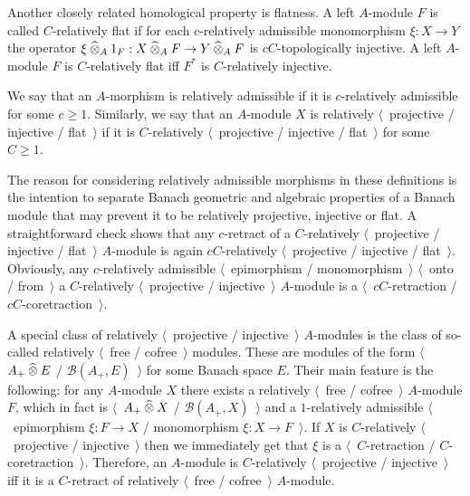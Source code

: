 Another closely related homological property is flatness. A
left $A$-module $F$ is called $C$-relatively flat if for each
$c$-relatively admissible monomorphism $\xi:X\to Y$ the operator 
$\xi\mathbin{\widehat{\otimes}}_{A} 1_F:X\mathbin{\widehat{\otimes}}_{A} F\to Y\mathbin{\widehat{\otimes}}_{A} F$ is
$cC$-topologically injective. A left $A$-module $F$ is $C$-relatively flat iff
$F^*$ is $C$-relatively injective. 

We say that an $A$-morphism is relatively admissible if it is $c$-relatively 
admissible for some $c\geq 1$. Similarly, we say that an $A$-module $X$ is 
relatively $\langle$~projective / injective / flat~$\rangle$ if it is  
$C$-relatively $\langle$~projective / injective / flat~$\rangle$ for 
some $C\geq 1$.

The reason for considering relatively admissible morphisms in these definitions
is the intention to separate Banach geometric and algebraic properties of a 
Banach module that may prevent it to be relatively projective, injective or flat. 
A straightforward check shows that any $c$-retract of a 
$C$-relatively $\langle$~projective / injective / flat~$\rangle$ $A$-module is 
again $cC$-relatively $\langle$~projective / injective / flat~$\rangle$. 
Obviously, any $c$-relatively admissible $\langle$~epimorphism
/ monomorphism~$\rangle$ $\langle$~onto / from~$\rangle$ a $C$-relatively
$\langle$~projective / injective~$\rangle$ $A$-module is a 
$\langle$~$cC$-retraction / $cC$-coretraction~$\rangle$.

A special class of relatively $\langle$~projective / injective~$\rangle$
$A$-modules is the class of so-called 
relatively $\langle$~free / cofree~$\rangle$ modules. 
These are modules of the form $\langle$~$A_+\mathbin{\widehat{\otimes}} E$ /
$\mathcal{B}(A_+,E)$~$\rangle$ for some Banach space $E$. Their main feature is
the following: for any $A$-module $X$ there exists a relatively $\langle$~free /
cofree~$\rangle$ $A$-module $F$, which in fact is $\langle$~$A_+\mathbin{\widehat{\otimes}} X$ /
$\mathcal{B}(A_+,X)$~$\rangle$ and a $1$-relatively admissible 
$\langle$~epimorphism $\xi:F\to X$ / monomorphism $\xi:X\to F$~$\rangle$. 
If $X$ is $C$-relatively
$\langle$~projective / injective~$\rangle$ then we immediately get that $\xi$ is a
$\langle$~$C$-retraction / $C$-coretraction~$\rangle$. Therefore, an $A$-module 
is $C$-relatively $\langle$~projective / injective~$\rangle$ iff it is 
a $C$-retract of relatively $\langle$~free / cofree~$\rangle$ $A$-module. 

